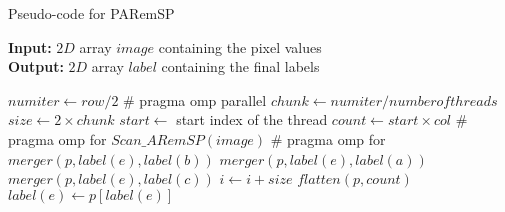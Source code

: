 \begin{algorithm}[ht!]
\small
{
	\caption{Pseudo-code for PARemSP}
	\label{alg:PARemSP}
	\textbf{Input:} $2D$ array $image$ containing the pixel values \\
	\textbf{Output:} $2D$ array $label$ containing the final labels
	\begin{algorithmic}[1]
		\State $num iter \gets row/2 $ 
		\State \# pragma omp parallel
			\State $chunk \gets numiter/number of threads $ 
			\State $size \gets 2 \times chunk$
			\State $start \gets $ start index of the thread
			\State $count \gets start \times col$
			\State \# pragma omp for
				\State $Scan\_ARemSP(image)$
			\State \# pragma omp for
					  			\State $merger(p,label(e),label(b))$
					  		\Else
									\State $merger(p,label(e),label(a))$
								\EndIf
									\State $merger(p,label(e),label(c))$
								\EndIf
							\EndIf
						\EndIf
					\EndFor
					\State $i \gets i + size$
				\EndFor		
		\State $flatten(p,count)$ 
				\State $label(e) \gets p[label(e)]$
			\EndFor
		\EndFor		
	\EndFunction
	\end{algorithmic}	
}
\end{algorithm}

